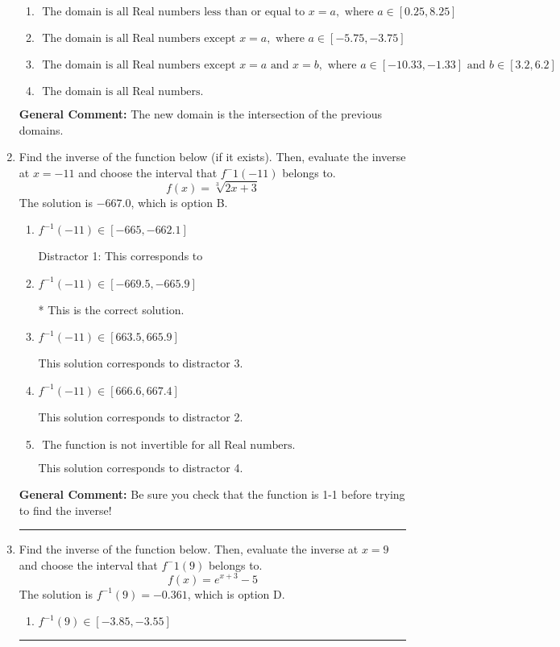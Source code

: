 \documentclass{extbook}[14pt]
\newcommand{\litem}[1]{\item #1

\rule{\textwidth}{0.4pt}}
\begin{document}
\begin{enumerate}
{\begin{enumerate}[label=\Alph*.]
\item \( \text{ The domain is all Real numbers less than or equal to } x = a, \text{ where } a \in [0.25, 8.25] \)


\item \( \text{ The domain is all Real numbers except } x = a, \text{ where } a \in [-5.75, -3.75] \)


\item \( \text{ The domain is all Real numbers except } x = a \text{ and } x = b, \text{ where } a \in [-10.33, -1.33] \text{ and } b \in [3.2, 6.2] \)


\item \( \text{ The domain is all Real numbers. } \)


\end{enumerate}

\textbf{General Comment:} The new domain is the intersection of the previous domains.
}
\litem{
Find the inverse of the function below (if it exists). Then, evaluate the inverse at $x = -11$ and choose the interval that $f^-1(-11)$ belongs to.
\[ f(x) = \sqrt[3]{2 x + 3} \]The solution is \( -667.0 \), which is option B.\begin{enumerate}[label=\Alph*.]
\item \( f^{-1}(-11) \in [-665, -662.1] \)

 Distractor 1: This corresponds to 
\item \( f^{-1}(-11) \in [-669.5, -665.9] \)

* This is the correct solution.
\item \( f^{-1}(-11) \in [663.5, 665.9] \)

 This solution corresponds to distractor 3.
\item \( f^{-1}(-11) \in [666.6, 667.4] \)

 This solution corresponds to distractor 2.
\item \( \text{ The function is not invertible for all Real numbers. } \)

 This solution corresponds to distractor 4.
\end{enumerate}

\textbf{General Comment:} Be sure you check that the function is 1-1 before trying to find the inverse!
}
\litem{
Find the inverse of the function below. Then, evaluate the inverse at $x = 9$ and choose the interval that $f^-1(9)$ belongs to.
\[ f(x) = e^{x+3}-5 \]The solution is \( f^{-1}(9) = -0.361 \), which is option D.\begin{enumerate}[label=\Alph*.]
\item \( f^{-1}(9) \in [-3.85, -3.55] \)


\end{enumerate}}
\end{enumerate}
\end{document}
